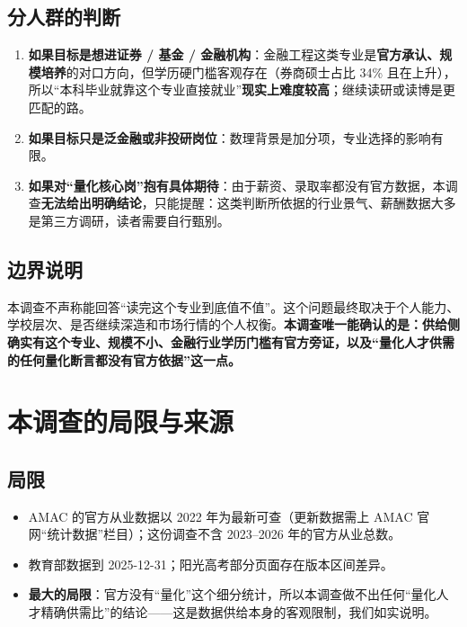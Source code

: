 \documentclass[UTF8,11pt]{ctexart}
\begin{document}
\subsection{分人群的判断}
\begin{enumerate}[itemsep=2pt]
\item \textbf{如果目标是想进证券 / 基金 / 金融机构}：金融工程这类专业是\textbf{官方承认、规模培养}的对口方向，但学历硬门槛客观存在（券商硕士占比 34\% 且在上升），所以“本科毕业就靠这个专业直接就业”\textbf{现实上难度较高}；继续读研或读博是更匹配的路。
\item \textbf{如果目标只是泛金融或非投研岗位}：数理背景是加分项，专业选择的影响有限。
\item \textbf{如果对“量化核心岗”抱有具体期待}：由于薪资、录取率都没有官方数据，本调查\textbf{无法给出明确结论}，只能提醒：这类判断所依据的行业景气、薪酬数据大多是第三方调研，读者需要自行甄别。
\end{enumerate}

\subsection{边界说明}
本调查不声称能回答“读完这个专业到底值不值”。这个问题最终取决于个人能力、学校层次、是否继续深造和市场行情的个人权衡。\textbf{本调查唯一能确认的是：供给侧确实有这个专业、规模不小、金融行业学历门槛有官方旁证，以及“量化人才供需的任何量化断言都没有官方依据”这一点。}

\section{本调查的局限与来源}

\subsection{局限}
\begin{itemize}[itemsep=2pt]
\item AMAC 的官方从业数据以 2022 年为最新可查（更新数据需上 AMAC 官网“统计数据”栏目）；这份调查不含 2023--2026 年的官方从业总数。
\item 教育部数据到 2025-12-31；阳光高考部分页面存在版本区间差异。
\item \textbf{最大的局限}：官方没有“量化”这个细分统计，所以本调查做不出任何“量化人才精确供需比”的结论——这是数据供给本身的客观限制，我们如实说明。
\end{itemize}
\end{document}
